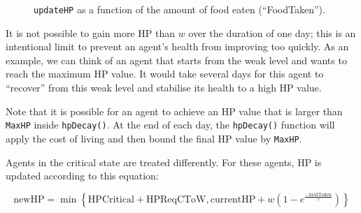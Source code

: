 \begin{figure}[htb]%
    \centering
    \qquad
    \caption{\texttt{updateHP} as a function of the amount of food eaten (``FoodTaken'').}%
    \label{fig:updateHP}%
\end{figure}

It is not possible to gain more HP than $w$ over the duration of one day; this is an intentional limit to prevent an agent's health from improving too quickly. As an example, we can think of an agent that starts from the weak level and wants to reach the maximum HP value. It would take several days for this agent to ``recover'' from this weak level and stabilise its health to a high HP value. 

Note that it is possible for an agent to achieve an HP value that is larger than \texttt{MaxHP} inside \lstinline$hpDecay()$. At the end of each day, the \lstinline$hpDecay()$ function will apply the cost of living and then bound the final HP value by \lstinline$MaxHP$.


Agents in the critical state are treated differently. For these agents, HP is updated according to this equation:

\begin{equation}\label{updateHP_critical}
    \text{newHP} = \min\left\{\text{HPCritical}+\text{HPReqCToW}, \text{currentHP} +w(1-e^{\frac{-\text{foodTaken}}{\tau}})\right\}
\end{equation}

